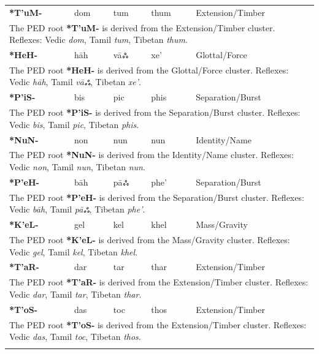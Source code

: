 \begin{longtable}{p{} p{} p{} p{} p{}}
\textbf{*T'uM-} & dom & tum & thum & Extension/Timber \\ 
\multicolumn{5}{p{\textwidth}}{\small The PED root \textbf{*T'uM-} is derived from the Extension/Timber cluster. Reflexes: Vedic \textit{dom}, Tamil \textit{tum}, Tibetan \textit{thum}. } \\ \addlinespace 
\textbf{*HeH-} & hāh & vāஃ & xe' & Glottal/Force \\ 
\multicolumn{5}{p{\textwidth}}{\small The PED root \textbf{*HeH-} is derived from the Glottal/Force cluster. Reflexes: Vedic \textit{hāh}, Tamil \textit{vāஃ}, Tibetan \textit{xe'}. } \\ \addlinespace 
\textbf{*P'iS-} & bis & pic & phis & Separation/Burst \\ 
\multicolumn{5}{p{\textwidth}}{\small The PED root \textbf{*P'iS-} is derived from the Separation/Burst cluster. Reflexes: Vedic \textit{bis}, Tamil \textit{pic}, Tibetan \textit{phis}. } \\ \addlinespace 
\textbf{*NuN-} & non & nun & nun & Identity/Name \\ 
\multicolumn{5}{p{\textwidth}}{\small The PED root \textbf{*NuN-} is derived from the Identity/Name cluster. Reflexes: Vedic \textit{non}, Tamil \textit{nun}, Tibetan \textit{nun}. } \\ \addlinespace 
\textbf{*P'eH-} & bāh & pāஃ & phe' & Separation/Burst \\ 
\multicolumn{5}{p{\textwidth}}{\small The PED root \textbf{*P'eH-} is derived from the Separation/Burst cluster. Reflexes: Vedic \textit{bāh}, Tamil \textit{pāஃ}, Tibetan \textit{phe'}. } \\ \addlinespace 
\textbf{*K'eL-} & gel & kel & khel & Mass/Gravity \\ 
\multicolumn{5}{p{\textwidth}}{\small The PED root \textbf{*K'eL-} is derived from the Mass/Gravity cluster. Reflexes: Vedic \textit{gel}, Tamil \textit{kel}, Tibetan \textit{khel}. } \\ \addlinespace 
\textbf{*T'aR-} & dar & tar & thar & Extension/Timber \\ 
\multicolumn{5}{p{\textwidth}}{\small The PED root \textbf{*T'aR-} is derived from the Extension/Timber cluster. Reflexes: Vedic \textit{dar}, Tamil \textit{tar}, Tibetan \textit{thar}. } \\ \addlinespace 
\textbf{*T'oS-} & das & toc & thos & Extension/Timber \\ 
\multicolumn{5}{p{\textwidth}}{\small The PED root \textbf{*T'oS-} is derived from the Extension/Timber cluster. Reflexes: Vedic \textit{das}, Tamil \textit{toc}, Tibetan \textit{thos}. } \\ \addlinespace 

\end{longtable}

